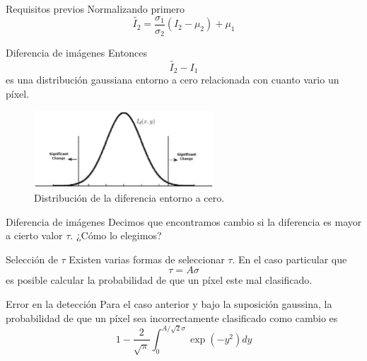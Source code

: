 \documentclass[handout,draft]{beamer}
\begin{document}
\begin{frame}{\subsecname}
  \begin{block}{Requisitos previos}
    Normalizando primero $$ \tilde{I_2} = \frac{\sigma_1}{\sigma_2} (I_2 - \mu_2) + \mu_1$$
  \end{block}
\end{frame}

\begin{frame}{\subsecname}
  \begin{block}{Diferencia de im\'agenes}
    Entonces $$\tilde{I_2} - I_1$$ es una distribuci\'on gaussiana entorno a cero relacionada con cuanto vario un p\'ixel.
  \end{block}
\end{frame}

\begin{frame}{\subsecname}
  \begin{figure}
  \includegraphics[width=0.6\textwidth]{imagenes/normal.png}
  \caption{Distribuci\'on de la diferencia entorno a cero.}
  \end{figure}
\end{frame}

\begin{frame}{\subsecname}
  \begin{block}{Diferencia de im\'agenes}
    Decimos que encontramos cambio si la diferencia es mayor a cierto valor $\tau$. \pause ¿C\'omo lo elegimos?
  \end{block}
\end{frame}

\begin{frame}{\subsecname}
  \begin{block}{Selecci\'on de $\tau$}
    Existen varias formas de seleccionar $\tau$. En el caso particular que $$\tau = A \sigma$$ es posible calcular la probabilidad de que un p\'ixel este mal clasificado.
  \end{block}
\end{frame}

\begin{frame}{\subsecname}
  \begin{block}{Error en la detecci\'on}
    Para el caso anterior y bajo la suposici\'on gaussina, la probabilidad de que un p\'ixel sea incorrectamente clasificado como cambio es $$1 - \frac{2}{\sqrt\pi} \int_0^{A/\sqrt{2}\sigma} \exp(-y^2) dy$$
  \end{block}
\end{frame}
\end{document}
